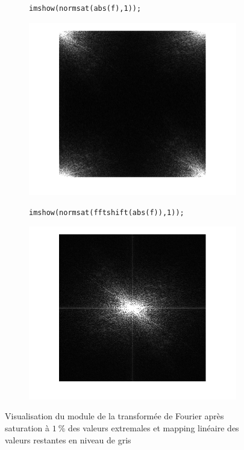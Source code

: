 \documentclass[12pt,a4paper,onecolumn]{article}
\begin{document}
\begin{figure}[H]
	\centering
	\begin{subfigure}[b]{\textwidth}
		\centering
		\begin{lstlisting}[frame = none, numbers = none]
		imshow(normsat(abs(f),1));
		\end{lstlisting}
		\includegraphics[scale = 1, height = 0.3\textheight]{7_31}
		\label{7_31}
	\end{subfigure}
	\vspace{2cm}
	\begin{subfigure}[b]{\textwidth}
		\centering
		\begin{lstlisting}[frame=none, numbers = none]
		imshow(normsat(fftshift(abs(f)),1));
		\end{lstlisting}
		\includegraphics[scale = 1, height = 0.3\textheight]{7_32}
		\label{7_32}
	\end{subfigure}
	\caption{Visualisation du module de la transformée de Fourier après saturation à \(1~\%\) des valeurs extremales et mapping linéaire des valeurs restantes en niveau de gris}
	\label{7_3}
\end{figure}
\end{document}
